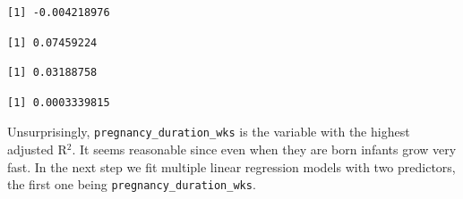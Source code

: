 \documentclass[
  letterpaper,
  DIV=11,
  numbers=noendperiod]{scrreprt}
\newenvironment{Shaded}{\begin{snugshade}}{\end{snugshade}}
\newcommand{\AttributeTok}[1]{\textcolor[rgb]{0.40,0.45,0.13}{#1}}
\newcommand{\FunctionTok}[1]{\textcolor[rgb]{0.28,0.35,0.67}{#1}}
\newcommand{\NormalTok}[1]{\textcolor[rgb]{0.00,0.23,0.31}{#1}}
\newcommand{\OtherTok}[1]{\textcolor[rgb]{0.00,0.23,0.31}{#1}}
\newcommand{\SpecialCharTok}[1]{\textcolor[rgb]{0.37,0.37,0.37}{#1}}
\begin{document}
\begin{verbatim}
[1] -0.004218976
\end{verbatim}

\begin{Shaded}
\end{Shaded}

\begin{verbatim}
[1] 0.07459224
\end{verbatim}

\begin{Shaded}
\end{Shaded}

\begin{verbatim}
[1] 0.03188758
\end{verbatim}

\begin{Shaded}
\end{Shaded}

\begin{verbatim}
[1] 0.0003339815
\end{verbatim}

Unsurprisingly, \texttt{pregnancy\_duration\_wks} is the variable with
the highest adjusted R\(^2\). It seems reasonable since even when they
are born infants grow very fast. In the next step we fit multiple linear
regression models with two predictors, the first one being
\texttt{pregnancy\_duration\_wks}.
\end{document}
